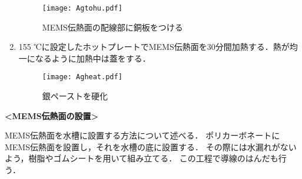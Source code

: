 \begin{enumerate}
\begin{figure}[ht]
\vspace{0zh}
\begin{center}
\texttt{[image: Agtohu.pdf]}
\vspace{-1zh}
\caption{MEMS伝熱面の配線部に銅板をつける}\label{wafer}
\end{center}
\vspace{0zh}
\end{figure}

\item 155 ℃に設定したホットプレートでMEMS伝熱面を30分間加熱する．熱が均一になるように加熱中は蓋をする．

\begin{figure}[ht]
\vspace{0zh}
\begin{center}
\texttt{[image: Agheat.pdf]}
\vspace{0zh}
\caption{銀ペーストを硬化}\label{ wafer}
\end{center}
\vspace{0zh}
\end{figure}


\end{enumerate}

\clearpage

\textbf{<MEMS伝熱面の設置>}

MEMS伝熱面を水槽に設置する方法について述べる．
ポリカーボネートにMEMS伝熱面を設置し，それを水槽の底に設置する．
その際には水漏れがないよう，樹脂やゴムシートを用いて組み立てる．
この工程で導線のはんだも行う．

